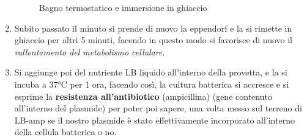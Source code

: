 \begin{enumerate}
	\begin{figure}[H]
	
		\centering
		 \quad
		\caption{Bagno termostatico e immersione in ghiaccio}
		\label{bango_e_ghiaccio}
	
	
	\end{figure}
	
	\item Subito passato il minuto si prende di nuovo la eppendorf e la si rimette in ghiaccio per altri 5 minuti, facendo in questo modo si favorisce di nuovo il \textit{rallentamento del metabolismo cellulare}. 
	
	\item Si aggiunge poi del nutriente LB liquido all'interno della provetta, e la si incuba a 37°C per 1 ora, facendo così, la cultura batterica si accresce e si esprime la  \textbf{resistenza all'antibiotico} (ampicillina) (gene contenuto all'interno del plasmide) per poter poi sapere, una volta messo sul terreno di LB-amp se il nostro plasmide è stato effettivamente incorporato all'interno della cellula batterica o no.
	

\end{enumerate}

